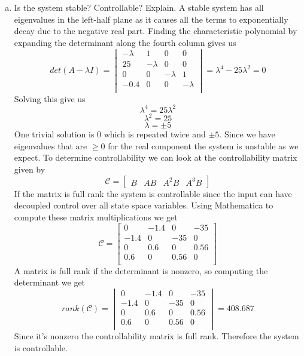 \documentclass{article}
\begin{document}
\begin{enumerate}[(a)]
\item Is the system stable? Controllable? Explain.
\newline
\newline
A stable system has all eigenvalues in the left-half plane as it causes all the terms to exponentially decay due to the negative real part.
Finding the characteristic polynomial by expanding the determinant along the fourth column gives us
$$
det(A-\lambda I) =
\begin{vmatrix}
-\lambda & 1 & 0 & 0 \\
25 & -\lambda & 0 & 0 \\
0 & 0 & -\lambda & 1 \\
-0.4 & 0 & 0 & -\lambda \\
\end{vmatrix}
=
\lambda^4 - 25\lambda^2
=0
$$
Solving this give us
$$ \lambda^4 = 25\lambda^2 $$
$$ \lambda^2 = 25 $$
$$ \lambda = \pm 5 $$
One trivial solution is $0$ which is repeated twice and $\pm 5$.
Since we have eigenvalues that are $\ge 0$ for the real component the system is unstable as we expect.
\newline
To determine controllability we can look at the controllability matrix given by
$$ \mathcal{C} = \begin{bmatrix} B & AB & A^2B & A^3B \end{bmatrix}$$
If the matrix is full rank the system is controllable since the input can have decoupled control over all state space variables.
Using Mathematica to compute these matrix multiplications we get
$$ \mathcal{C} =
\begin{bmatrix}
   0 & -1.4 & 0 & -35 \\
-1.4 & 0 & -35 & 0 \\
   0 & 0.6 & 0 & 0.56 \\
 0.6 & 0 & 0.56 & 0 \\
\end{bmatrix}
$$
A matrix is full rank if the determinant is nonzero, so computing the determinant we get
$$ rank(\mathcal{C}) =
\begin{vmatrix}
   0 & -1.4 & 0 & -35 \\
-1.4 & 0 & -35 & 0 \\
   0 & 0.6 & 0 & 0.56 \\
 0.6 & 0 & 0.56 & 0 \\
\end{vmatrix}
=
408.687
$$
Since it's nonzero the controllability matrix is full rank. Therefore the system is controllable.


\end{enumerate}
\end{document}
